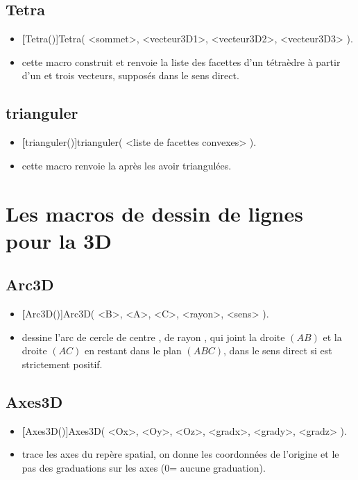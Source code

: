 \subsection{Tetra}
\begin{itemize}
 \item \util \textbf[Tetra()]{Tetra( <sommet>, <vecteur3D1>, <vecteur3D2>, <vecteur3D3> )}.
 \item \desc cette macro construit et renvoie la liste des facettes d'un tétraèdre à partir d'un  et trois vecteurs, supposés dans le sens direct.
\end{itemize}

\subsection{trianguler}
\begin{itemize}
 \item \util \textbf[trianguler()]{trianguler( <liste de facettes convexes> )}.
 \item \desc cette macro renvoie la  après les avoir triangulées.
\end{itemize}


\section{Les macros de dessin de lignes pour la 3D}

\subsection{Arc3D}
\begin{itemize}
 \item \util \textbf[Arc3D()]{Arc3D( <B>, <A>, <C>, <rayon>, <sens> )}.
 \item \desc dessine l'arc de cercle de centre , de rayon , qui joint la droite $(AB)$ et la droite $(AC)$ en restant dans le plan $(ABC)$, dans le sens direct si  est strictement positif.
\end{itemize}


\subsection{Axes3D}
\begin{itemize}
 \item \util \textbf[Axes3D()]{Axes3D( <Ox>, <Oy>, <Oz>, <gradx>, <grady>, <gradz> )}.
 \item \desc trace les axes du repère spatial, on donne les coordonnées de l'origine et le pas des graduations sur les axes (0= aucune graduation).
\end{itemize}

